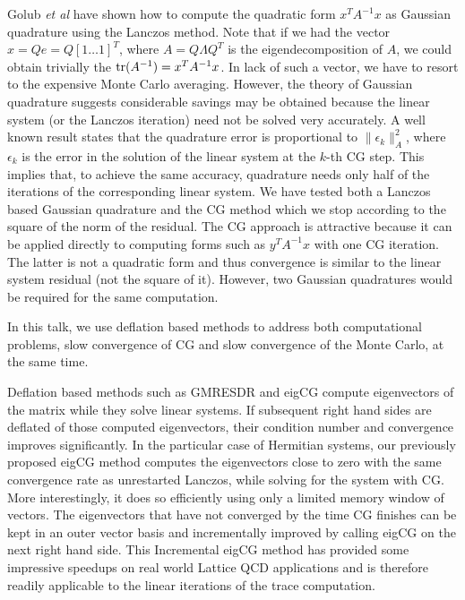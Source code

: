 \documentclass{report}
\begin{document}
Golub {\em et al} have shown how to compute the quadratic
form $x^TA^{-1}x$ as Gaussian quadrature using the Lanczos method.
Note that if we had the vector $x = Qe = Q[1\ldots 1]^T$,
where $A = Q\Lambda Q^T$ is the eigendecomposition of $A$,
we could obtain trivially the ${\rm tr}(A^{-1}) = x^TA^{-1}x$.
In lack of such a vector, we have to resort to the expensive Monte Carlo
averaging. However, the theory of Gaussian quadrature suggests considerable
savings may be obtained because the linear system (or the Lanczos iteration)
need not be solved very accurately. A well known result states that the
quadrature error is proportional to $\|\epsilon_k\|^2_A$, where $\epsilon_k$
is the error in the solution of the linear system at the $k$-th CG step.
This implies that, to achieve the same accuracy, quadrature needs only half
of the iterations of the corresponding linear system.
We have tested both a Lanczos based Gaussian quadrature
and the CG method which we stop according to the square of the norm
of the residual. The CG approach is attractive because it can be
applied directly to computing forms such as $y^TA^{-1}x$ with one CG
iteration. The latter is not a quadratic form and thus convergence is
similar to the linear system residual (not the square of it). However,
two Gaussian quadratures would be required for the same computation.

In this talk, we use deflation based methods to address both
computational problems, slow convergence of CG and slow convergence of
the Monte Carlo, at the same time.

Deflation based methods such as GMRESDR and eigCG compute eigenvectors of
the matrix while they solve linear systems. If subsequent right hand sides
are deflated of those computed eigenvectors, their condition number
and convergence improves significantly. In the particular case of Hermitian
systems, our previously proposed eigCG method computes the eigenvectors
close to zero with the same convergence rate as unrestarted Lanczos, while
solving for the system with CG. More interestingly, it does so efficiently
using only a limited memory window of vectors. The eigenvectors that have
not converged by the time CG finishes can be kept in an outer vector basis
and incrementally improved by calling eigCG on the next right hand side.
This Incremental eigCG method has provided some impressive speedups on
real world Lattice QCD applications and is therefore readily applicable to
the linear iterations of the trace computation.
\end{document}

